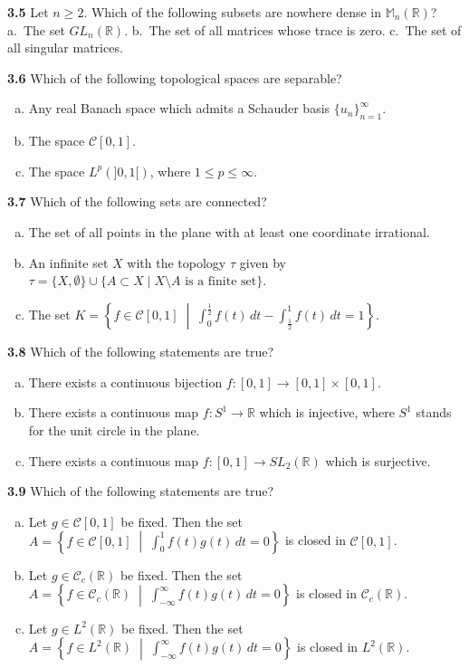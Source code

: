 \documentclass[11pt,a4paper]{article}
\newcommand{\R}{\mathbb{R}}
\newcommand{\M}{\mathbb{M}}
\newcommand{\qitem}[1]{\par\medskip\noindent\textbf{#1}\hspace{0.5em}}
\begin{document}
\qitem{3.5} Let $n \ge 2$. Which of the following subsets are nowhere dense in $\M_n(\R)$?\\
a.\ The set $GL_n(\R)$. \qquad b.\ The set of all matrices whose trace is zero. \qquad c.\ The set of all singular matrices.

\qitem{3.6} Which of the following topological spaces are separable?
\begin{enumerate}[a.]
  \item Any real Banach space which admits a Schauder basis $\{u_n\}_{n=1}^{\infty}$.
  \item The space $\mathcal{C}[0, 1]$.
  \item The space $L^p(]0, 1[)$, where $1 \le p \le \infty$.
\end{enumerate}

\qitem{3.7} Which of the following sets are connected?
\begin{enumerate}[a.]
  \item The set of all points in the plane with at least one coordinate irrational.
  \item An infinite set $X$ with the topology $\tau$ given by $\tau = \{X, \emptyset\} \cup \{A \subset X \mid X \setminus A \text{ is a finite set}\}$.
  \item The set $K = \left\{f \in \mathcal{C}[0, 1] \;\middle|\; \int_0^{\frac{1}{2}} f(t)\,dt - \int_{\frac{1}{2}}^{1} f(t)\,dt = 1\right\}$.
\end{enumerate}

\qitem{3.8} Which of the following statements are true?
\begin{enumerate}[a.]
  \item There exists a continuous bijection $f : [0, 1] \to [0, 1] \times [0, 1]$.
  \item There exists a continuous map $f : S^1 \to \R$ which is injective, where $S^1$ stands for the unit circle in the plane.
  \item There exists a continuous map $f : [0, 1] \to SL_2(\R)$ which is surjective.
\end{enumerate}

\qitem{3.9} Which of the following statements are true?
\begin{enumerate}[a.]
  \item Let $g \in \mathcal{C}[0, 1]$ be fixed. Then the set $A = \left\{f \in \mathcal{C}[0, 1] \;\middle|\; \int_0^1 f(t)g(t)\,dt = 0\right\}$ is closed in $\mathcal{C}[0, 1]$.
  \item Let $g \in \mathcal{C}_c(\R)$ be fixed. Then the set $A = \left\{f \in \mathcal{C}_c(\R) \;\middle|\; \int_{-\infty}^{\infty} f(t)g(t)\,dt = 0\right\}$ is closed in $\mathcal{C}_c(\R)$.
  \item Let $g \in L^2(\R)$ be fixed. Then the set $A = \left\{f \in L^2(\R) \;\middle|\; \int_{-\infty}^{\infty} f(t)g(t)\,dt = 0\right\}$ is closed in $L^2(\R)$.
\end{enumerate}
\end{document}
